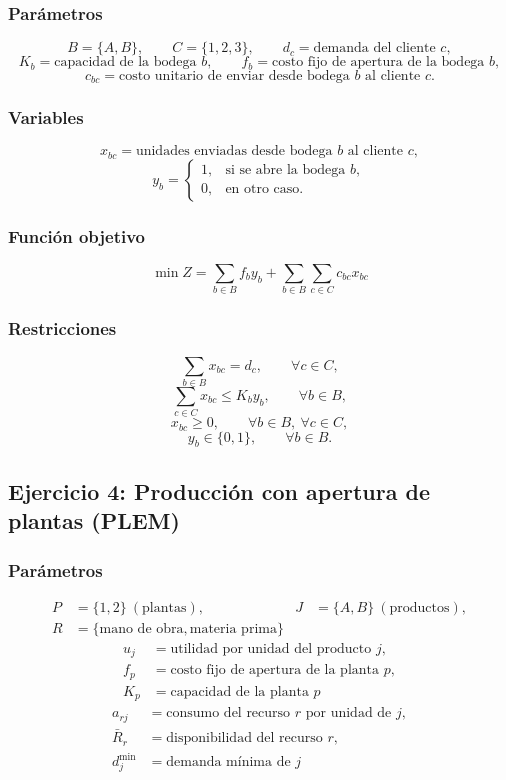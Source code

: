 \documentclass[12pt,letterpaper]{article}
\begin{document}
\subsubsection*{Parámetros}
\[
B=\{A,B\},\qquad
C=\{1,2,3\},\qquad
d_c=\text{demanda del cliente } c,
\]
\[
K_b=\text{capacidad de la bodega } b,\qquad
f_b=\text{costo fijo de apertura de la bodega } b,
\]
\[
c_{bc}=\text{costo unitario de enviar desde bodega } b \text{ al cliente } c.
\]

\subsubsection*{Variables}
\[
x_{bc}=\text{unidades enviadas desde bodega } b \text{ al cliente } c,
\]
\[
y_b=\begin{cases}
1,& \text{si se abre la bodega } b,\\
0,& \text{en otro caso.}
\end{cases}
\]

\subsubsection*{Función objetivo}
\[
\min Z=\sum_{b\in B}f_b y_b+\sum_{b\in B}\sum_{c\in C}c_{bc}x_{bc}
\]

\subsubsection*{Restricciones}
\[
\sum_{b\in B}x_{bc}=d_c,\qquad \forall c\in C,
\]
\[
\sum_{c\in C}x_{bc}\le K_b y_b,\qquad \forall b\in B,
\]
\[
x_{bc}\ge 0,\qquad \forall b\in B,\ \forall c\in C,
\]
\[
y_b\in\{0,1\},\qquad \forall b\in B.
\]

\subsection{Ejercicio 4: Producción con apertura de plantas (PLEM)}

\subsubsection*{Parámetros}
\begin{align*}
P&=\{1,2\}\ (\text{plantas}), & J&=\{A,B\}\ (\text{productos}), \\
R&=\{\text{mano de obra},\text{materia prima}\}
\end{align*}
\begin{align*}
u_j&=\text{utilidad por unidad del producto } j,\\
f_p&=\text{costo fijo de apertura de la planta } p,\\
K_p&=\text{capacidad de la planta } p
\end{align*}
\begin{align*}
a_{rj}&=\text{consumo del recurso } r \text{ por unidad de } j,\\
\bar{R}_r&=\text{disponibilidad del recurso } r,\\
d_j^{\min}&=\text{demanda mínima de } j
\end{align*}
\end{document}
